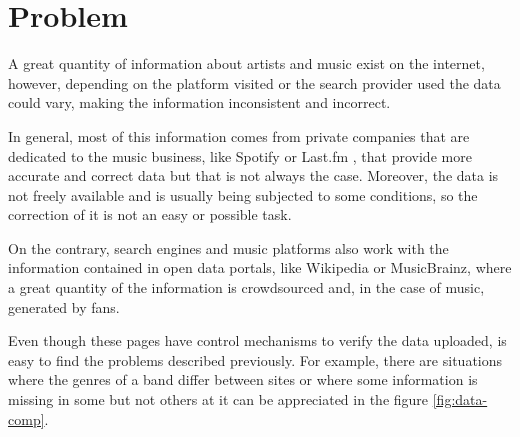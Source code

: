 \section{Problem}
A great quantity of information about artists and music exist on the internet, however, depending on the platform visited or the search provider used the data could vary, making the information inconsistent and incorrect.

In general, most of this information comes from private companies that are dedicated to the music business, like Spotify \citep{spotify} or Last.fm \citep{lastfm}, that provide more accurate and correct data but that is not always the case. Moreover, the data is not freely available and is usually being subjected to some conditions, so the correction of it is not an easy or possible task.  

On the contrary, search engines and music platforms also work with the information contained in open data portals, like Wikipedia or MusicBrainz, where a great quantity of the information is crowdsourced and, in the case of music, generated by fans.  

Even though these pages have control mechanisms to verify the data uploaded, is easy to find the problems described previously. For example, there are situations where the genres of a band differ between sites or where some information is missing in some but not others at it can be appreciated in the figure \ref{fig:data-comp}.

